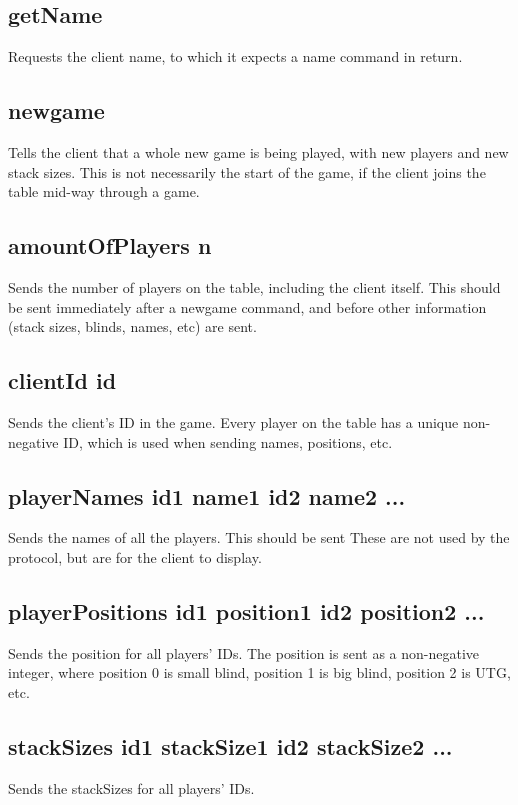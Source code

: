\documentclass{article}
\begin{document}
\subsection{getName}
Requests the client name, to which it expects a name command in return.

\subsection{newgame}
Tells the client that a whole new game is being played, with new players and new stack sizes. This is not necessarily the start of the game, if the client joins the table mid-way through a game.

\subsection{amountOfPlayers \textlangle{}n\textrangle{}}
Sends the number of players on the table, including the client itself. This should be sent immediately after a newgame command, and before other information (stack sizes, blinds, names, etc) are sent.

\subsection{clientId \textlangle{}id\textrangle{}}
Sends the client's ID in the game. Every player on the table has a unique non-negative ID, which is used when sending names, positions, etc.

\subsection{playerNames \textlangle{}id1 name1\textrangle{} \textlangle{}id2 name2\textrangle{} ... }
Sends the names of all the players. This should be sent These are not used by the protocol, but are for the client to display.

\subsection{playerPositions \textlangle{}id1 position1\textrangle{} \textlangle{}id2 position2\textrangle{} ... }
Sends the position for all players' IDs. The position is sent as a non-negative integer, where position 0 is small blind, position 1 is big blind, position 2 is UTG, etc.

\subsection{stackSizes \textlangle{}id1 stackSize1\textrangle{} \textlangle{}id2 stackSize2\textrangle{} ... }
Sends the stackSizes for all players' IDs.
\end{document}
